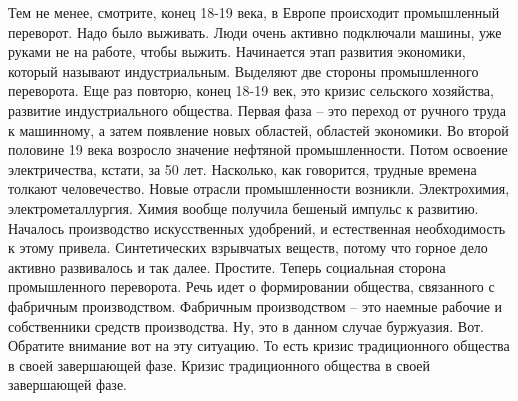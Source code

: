 Тем не менее, смотрите, конец 18-19 века, в Европе
происходит промышленный переворот. Надо было выживать. Люди очень активно
подключали машины, уже руками не на работе, чтобы выжить. Начинается этап
развития экономики, который называют индустриальным. Выделяют две стороны
промышленного переворота. Еще раз повторю, конец 18-19 век, это кризис сельского
хозяйства, развитие индустриального общества. Первая фаза – это переход от
ручного труда к машинному, а затем появление новых областей, областей экономики.
Во второй половине 19 века возросло значение нефтяной промышленности. Потом
освоение электричества, кстати, за 50 лет. Насколько, как говорится, трудные
времена толкают человечество. Новые отрасли промышленности возникли.
Электрохимия, электрометаллургия. Химия вообще получила бешеный импульс к
развитию. Началось производство искусственных удобрений, и естественная
необходимость к этому привела. Синтетических взрывчатых веществ, потому что
горное дело активно развивалось и так далее. Простите. Теперь социальная сторона
промышленного переворота. Речь идет о формировании общества, связанного с
фабричным производством. Фабричным производством – это наемные рабочие и
собственники средств производства. Ну, это в данном случае буржуазия. Вот.
Обратите внимание вот на эту ситуацию. То есть кризис традиционного общества в
своей завершающей фазе. Кризис традиционного общества в своей завершающей фазе.

